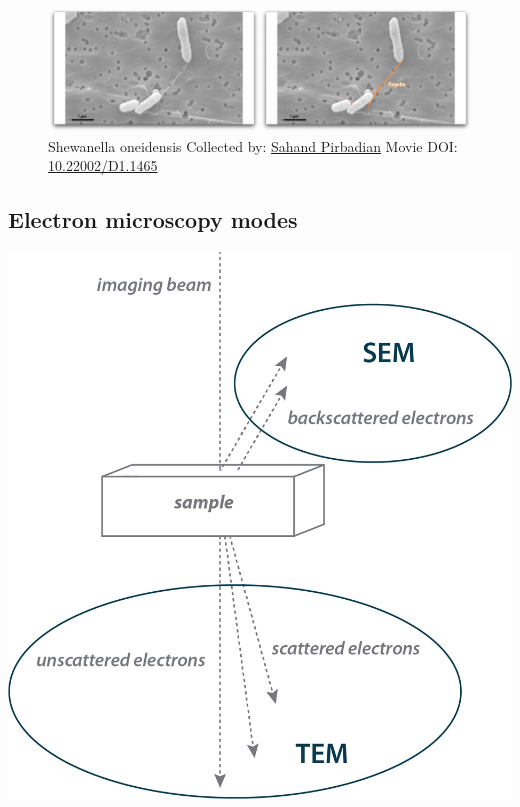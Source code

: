 \documentclass[]{tufte-book}
\begin{document}
\begin{figure}
\includegraphics{movie_stills/1_3} \caption[Shewanella oneidensis Collected by:
\protect\hyperlink{sahand_pirbadian}{Sahand Pirbadian} Movie DOI:
\href{https://doi.org/10.22002/D1.1465}{10.22002/D1.1465}]{Shewanella oneidensis Collected by:
\protect\hyperlink{sahand_pirbadian}{Sahand Pirbadian} Movie DOI:
\href{https://doi.org/10.22002/D1.1465}{10.22002/D1.1465}}\label{fig:1-3}
\end{figure}

\subsection{Electron microscopy modes}\label{Electron_microscopy_modes}

\includegraphics{img/schematics/1_3_1}
\end{document}
